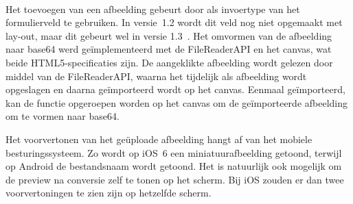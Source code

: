 \begin{table}[H]
\centering
{}
\caption{Gebruik van  voor \st{}~(\sta), \kendo{}~(\kendoa), \jqm{}~(\jqma) en \lungo{}~(\lungoa).}
\label{tabel:evaluatie-gebruik-afbeelding}
\end{table}

\paragraph{\jqm}
Het toevoegen van een afbeelding gebeurt door  als invoertype van het formulierveld te gebruiken. 
In versie~1.2 wordt dit veld nog niet opgemaakt met lay-out, maar dit gebeurt wel in versie 1.3~\cite{JQuery2013d}. 
Het omvormen van de afbeelding naar base64 werd geïmplementeerd met de FileReaderAPI en het canvas, wat beide HTML5-specificaties zijn. 
De aangeklikte afbeelding wordt gelezen door middel van de FileReaderAPI, waarna het tijdelijk als afbeelding wordt opgeslagen en daarna geïmporteerd wordt op het canvas. 
Eenmaal geïmporteerd, kan de functie  opgeroepen worden op het canvas om de geïmporteerde afbeelding om te vormen naar base64. 

Het voorvertonen van het geüploade afbeelding hangt af van het mobiele besturingssysteem.
Zo wordt op iOS~6 een miniatuurafbeelding getoond, terwijl op Android de bestandsnaam wordt getoond.
Het is natuurlijk ook mogelijk om de preview na conversie zelf te tonen op het scherm.
Bij iOS zouden er dan twee voorvertoningen te zien zijn op hetzelfde scherm.

